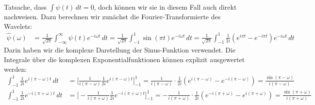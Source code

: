 \begin{loesung}
\begin{teilaufgaben}
Tatsache, dass $\int \psi(t)\,dt=0$, doch können wir sie in diesem Fall
auch direkt nachweisen.
Dazu berechnen wir zunächst die Fourier-Transformierte des Wavelets:
\begin{align*}
\hat{\psi}(\omega)
&=
\frac{1}{\sqrt{2\pi}}
\int_{-\infty}^\infty \psi(t)e^{-i\omega t}\,dt
=
\frac{1}{\sqrt{2\pi}}
\int_{-1}^{1} \sin(\pi t)e^{-i\omega t}\,dt
=
\frac{1}{\sqrt{2\pi}}
\int_{-1}^1
\frac1{2i} (e^{i\pi t}-e^{-i\pi t})e^{-i\omega t}\,dt
\end{align*}
Darin haben wir die komplexe Darstellung der Sinus-Funktion verwendet.
Die Integrale über die komplexen Exponentialfunktionen können explizit
ausgewertet werden:
\begin{align*}
\int_{-1}^1 \frac{1}{2i}e^{i(\pi-\omega)t}\,dt
&=
\biggl[
\frac{1}{i(\pi-\omega)}
\frac1{2i}
e^{i(\pi-\omega)t}
\biggr]_{-1}^1
=
\frac{1}{i(\pi-\omega)}
\cdot
\frac1{2i}(e^{i(\pi-\omega)}-e^{-i(\pi-\omega)})
=
\frac{\sin(\pi-\omega)}{i(\pi-\omega)}
\\
\int_{-1}^1 \frac{1}{2i}e^{-i(\pi+\omega)t}\,dt
&=
\biggl[
-\frac{1}{i(\pi+\omega)}
\frac1{2i}
e^{-i(\pi+\omega)t}
\biggr]_{-1}^1
=
-\frac{1}{i(\pi+\omega)}
\cdot
\frac1{2i}(e^{-i(\pi+\omega)}-e^{i(\pi+\omega)})
=
\frac{\sin(\pi+\omega)}{i(\pi+\omega)}
\end{align*}
\end{teilaufgaben}
\end{loesung}
